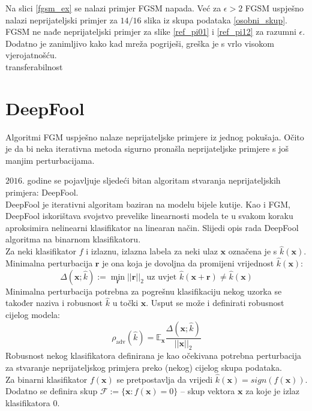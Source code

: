 \documentclass[utf8, diplomski]{fer}
\begin{document}
Na slici \ref{fgsm_ex} se nalazi primjer FGSM napada. Već za $\epsilon > 2$ FGSM uspješno nalazi neprijateljski primjer za $14/16$ slika iz skupa podataka \ref{osobni_skup}. FGSM ne nađe neprijateljski primjer za slike \ref{ref_pi01} i \ref{ref_pi12} za razumni $\epsilon$. Dodatno je zanimljivo kako kad mreža pogriješi, greška je s vrlo visokom vjerojatnošću. \\
transferabilnost \\
\section{DeepFool}
Algoritmi FGM uspješno nalaze neprijateljske primjere iz jednog pokušaja. Očito je da bi neka iterativna metoda sigurno pronašla neprijateljske primjere s još manjim perturbacijama.
\par
$2016.$ godine se pojavljuje sljedeći bitan algoritam stvaranja neprijateljskih primjera: DeepFool.\\
DeepFool je iterativni algoritam baziran na modelu bijele kutije. Kao i FGM, DeepFool iskorištava svojstvo prevelike linearnosti modela te u svakom koraku aproksimira nelinearni klasifikator na linearan način. Slijedi opis rada DeepFool algoritma na binarnom klasifikatoru. \\
Za neki klasifikator $f$ i izlaznu, izlazna labela za neki ulaz $\boldsymbol{x}$ označena je s $\hat{k}(\boldsymbol{x})$. Minimalna perturbacija $\boldsymbol{r}$ je ona koja je dovoljna da promijeni vrijednost $\hat{k}(\boldsymbol{x})$:
\begin{equation}
	\Delta (\boldsymbol{x}; \hat{k}) := \mathop{\min}_{\boldsymbol{r}} ||\boldsymbol{r}||_{2} \text{ uz uvjet } \hat{k}(\boldsymbol{x}+\boldsymbol{r}) \neq \hat{k}(\boldsymbol{x})
\end{equation}
Minimalna perturbacija potrebna za pogrešnu klasifikaciju nekog uzorka se također naziva i robusnost $\hat{k}$ u točki $\boldsymbol{x}$. Usput se može i definirati robusnost cijelog modela:
\begin{equation}
	\rho_{\text{adv}}(\hat{k}) = \mathbb{E}_{\boldsymbol{x}} \frac{\Delta (\boldsymbol{x}; \hat{k})}{||\boldsymbol{x}||_{2}} 
\end{equation}
Robusnost nekog klasifikatora definirana je kao očekivana potrebna perturbacija za stvaranje neprijateljskog primjera preko (nekog) cijelog skupa podataka. \\
Za binarni klasifikator $f(\boldsymbol{x})$ se pretpostavlja da vrijedi $\hat{k}(\boldsymbol{x}) = sign(f(\boldsymbol{x}))$. Dodatno se definira skup $\mathscr{F} := \{\boldsymbol{x} : f(\boldsymbol{x}) = 0\}$ -- skup vektora $\boldsymbol{x}$ za koje je izlaz klasifikatora $0$. \\
\end{document}
